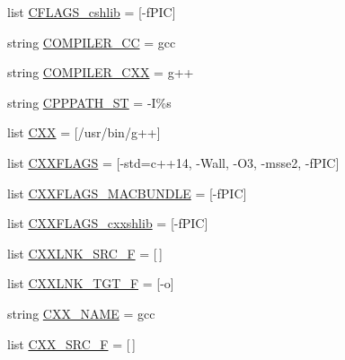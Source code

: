 \begin{DoxyCompactItemize}
\item 
list \hyperlink{namespace__cache_a41ce0150a1009a75a676bed7a9adf799}{C\+F\+L\+A\+G\+S\+\_\+cshlib} = \mbox{[}\textquotesingle{}-\/f\+P\+IC\textquotesingle{}\mbox{]}
\item 
string \hyperlink{namespace__cache_aeb5bb7082e7da665b2f671dd81038f41}{C\+O\+M\+P\+I\+L\+E\+R\+\_\+\+CC} = \textquotesingle{}gcc\textquotesingle{}
\item 
string \hyperlink{namespace__cache_a7c5d9c9adac5da07f1522aaa2febd54a}{C\+O\+M\+P\+I\+L\+E\+R\+\_\+\+C\+XX} = \textquotesingle{}g++\textquotesingle{}
\item 
string \hyperlink{namespace__cache_aea243862b93a971a09cafd3cd5355ebe}{C\+P\+P\+P\+A\+T\+H\+\_\+\+ST} = \textquotesingle{}-\/I\%s\textquotesingle{}
\item 
list \hyperlink{namespace__cache_ab1c2d07ccae422dfa40f618a85bf4a51}{C\+XX} = \mbox{[}\textquotesingle{}/usr/bin/g++\textquotesingle{}\mbox{]}
\item 
list \hyperlink{namespace__cache_a2c3fafbcc76e0cda705550d52d322852}{C\+X\+X\+F\+L\+A\+GS} = \mbox{[}\textquotesingle{}-\/std=c++14\textquotesingle{}, \textquotesingle{}-\/Wall\textquotesingle{}, \textquotesingle{}-\/O3\textquotesingle{}, \textquotesingle{}-\/msse2\textquotesingle{}, \textquotesingle{}-\/f\+P\+IC\textquotesingle{}\mbox{]}
\item 
list \hyperlink{namespace__cache_a430f24190c7f5995177dff92ce6caf55}{C\+X\+X\+F\+L\+A\+G\+S\+\_\+\+M\+A\+C\+B\+U\+N\+D\+LE} = \mbox{[}\textquotesingle{}-\/f\+P\+IC\textquotesingle{}\mbox{]}
\item 
list \hyperlink{namespace__cache_a65efe608b21d6ef648a4d11d85fb7d19}{C\+X\+X\+F\+L\+A\+G\+S\+\_\+cxxshlib} = \mbox{[}\textquotesingle{}-\/f\+P\+IC\textquotesingle{}\mbox{]}
\item 
list \hyperlink{namespace__cache_ab36d6a7f4b093a037803492ee078e43c}{C\+X\+X\+L\+N\+K\+\_\+\+S\+R\+C\+\_\+F} = \mbox{[}$\,$\mbox{]}
\item 
list \hyperlink{namespace__cache_ab1ae59a082435f406076b612f64ea9e3}{C\+X\+X\+L\+N\+K\+\_\+\+T\+G\+T\+\_\+F} = \mbox{[}\textquotesingle{}-\/o\textquotesingle{}\mbox{]}
\item 
string \hyperlink{namespace__cache_a5add92dcd4f43ae3584d1e76dd863e72}{C\+X\+X\+\_\+\+N\+A\+ME} = \textquotesingle{}gcc\textquotesingle{}
\item 
list \hyperlink{namespace__cache_a7b271101a2f95afe7ef1daeeb48c7163}{C\+X\+X\+\_\+\+S\+R\+C\+\_\+F} = \mbox{[}$\,$\mbox{]}
\item 

\end{DoxyCompactItemize}
